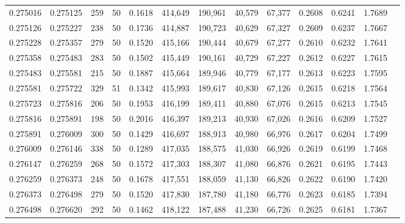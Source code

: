 \begin{tabular}{rrrrrrrrrrrrr}
0.275016 & 0.275125 &   259 &  50 &                                     0.1618 & 414,649 & 190,961 &  40,579 &  67,377 & 0.2608 & 0.6241 & 1.7689 \\
0.275126 & 0.275227 &   238 &  50 &                                     0.1736 & 414,887 & 190,723 &  40,629 &  67,327 & 0.2609 & 0.6237 & 1.7667 \\
0.275228 & 0.275357 &   279 &  50 &                                     0.1520 & 415,166 & 190,444 &  40,679 &  67,277 & 0.2610 & 0.6232 & 1.7641 \\
0.275358 & 0.275483 &   283 &  50 &                                     0.1502 & 415,449 & 190,161 &  40,729 &  67,227 & 0.2612 & 0.6227 & 1.7615 \\
0.275483 & 0.275581 &   215 &  50 &                                     0.1887 & 415,664 & 189,946 &  40,779 &  67,177 & 0.2613 & 0.6223 & 1.7595 \\
0.275581 & 0.275722 &   329 &  51 &                                     0.1342 & 415,993 & 189,617 &  40,830 &  67,126 & 0.2615 & 0.6218 & 1.7564 \\
0.275723 & 0.275816 &   206 &  50 &                                     0.1953 & 416,199 & 189,411 &  40,880 &  67,076 & 0.2615 & 0.6213 & 1.7545 \\
0.275816 & 0.275891 &   198 &  50 &                                     0.2016 & 416,397 & 189,213 &  40,930 &  67,026 & 0.2616 & 0.6209 & 1.7527 \\
0.275891 & 0.276009 &   300 &  50 &                                     0.1429 & 416,697 & 188,913 &  40,980 &  66,976 & 0.2617 & 0.6204 & 1.7499 \\
0.276009 & 0.276146 &   338 &  50 &                                     0.1289 & 417,035 & 188,575 &  41,030 &  66,926 & 0.2619 & 0.6199 & 1.7468 \\
0.276147 & 0.276259 &   268 &  50 &                                     0.1572 & 417,303 & 188,307 &  41,080 &  66,876 & 0.2621 & 0.6195 & 1.7443 \\
0.276259 & 0.276373 &   248 &  50 &                                     0.1678 & 417,551 & 188,059 &  41,130 &  66,826 & 0.2622 & 0.6190 & 1.7420 \\
0.276373 & 0.276498 &   279 &  50 &                                     0.1520 & 417,830 & 187,780 &  41,180 &  66,776 & 0.2623 & 0.6185 & 1.7394 \\
0.276498 & 0.276620 &   292 &  50 &                                     0.1462 & 418,122 & 187,488 &  41,230 &  66,726 & 0.2625 & 0.6181 & 1.7367 \\

\end{tabular}
